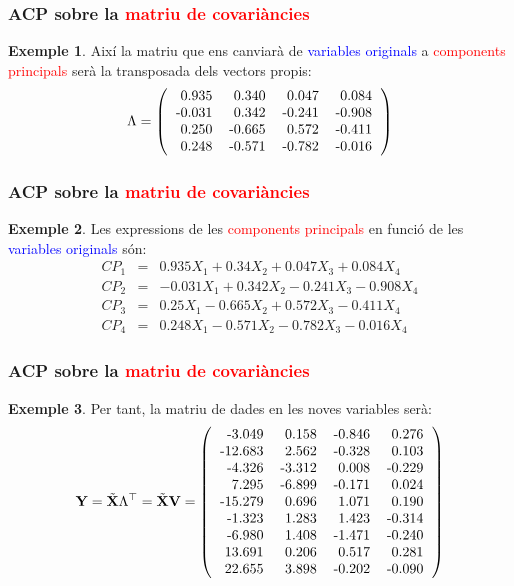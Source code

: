 \documentclass[12pt,t]{beamer}
\newcommand{\red}[1]{\textcolor{red}{#1}}
\newcommand{\blue}[1]{\textcolor{blue}{#1}}
\theoremstyle{plain}
\theoremstyle{definition}
\newtheorem{exemple}{Exemple}
\begin{document}
\begin{frame}
\frametitle{ACP sobre la \red{matriu de covariàncies}}
\begin{exemple}
{
Així la matriu que ens canviarà de \blue{variables originals} a \red{components principals} serà la transposada dels 
vectors propis:
\[
\Lambda=
\left(
\begin{tabular}{rrrr}
  0.935 & 0.340 & 0.047 & 0.084 \\ 
  -0.031 & 0.342 & -0.241 & -0.908 \\ 
  0.250 & -0.665 & 0.572 & -0.411 \\ 
  0.248 & -0.571 & -0.782 & -0.016 \\ 
  \end{tabular}\right)
\]
}
\end{exemple}
\end{frame}


\begin{frame}
\frametitle{ACP sobre la \red{matriu de covariàncies}}
\begin{exemple}
Les expressions de les \red{components principals} en funció de les \blue{variables originals} són:
\begin{eqnarray*}
CP_1 &=& 0.935X_1 
+0.34X_2
+0.047X_3 
+0.084X_4
\\
CP_2 &=& -0.031X_1
+0.342X_2
-0.241X_3 
-0.908X_4
\\
CP_3 &=& 0.25X_1
-0.665X_2
+0.572X_3 
-0.411X_4 \\
CP_4 &=& 0.248X_1
-0.571X_2
-0.782X_3 
-0.016X_4
\end{eqnarray*}
\end{exemple}
\end{frame}

\begin{frame}
\frametitle{ACP sobre la \red{matriu de covariàncies}}
\begin{exemple}
{\small
Per tant, la matriu de dades en les noves variables serà:
\[
\mathbf{Y}=\tilde{\mathbf{X}}\Lambda^\top = \tilde{\mathbf{X}}\mathbf{V}=
\left(
\begin{tabular}{rrrr}
  -3.049 & 0.158 & -0.846 & 0.276 \\ 
  -12.683 & 2.562 & -0.328 & 0.103 \\ 
  -4.326 & -3.312 & 0.008 & -0.229 \\ 
  7.295 & -6.899 & -0.171 & 0.024 \\ 
  -15.279 & 0.696 & 1.071 & 0.190 \\ 
  -1.323 & 1.283 & 1.423 & -0.314 \\ 
  -6.980 & 1.408 & -1.471 & -0.240 \\ 
  13.691 & 0.206 & 0.517 & 0.281 \\ 
  22.655 & 3.898 & -0.202 & -0.090 \\ 
  \end{tabular}\right)
\]
}
\end{exemple}
\end{frame}
\end{document}
